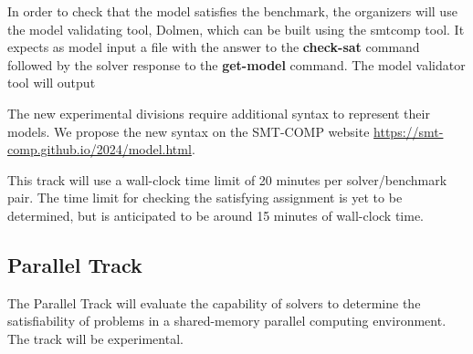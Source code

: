 \documentclass[12pt]{article}
\newcommand{\akey}[1]{\textbf{#1}\xspace}
\newcommand{\paralleltrack}{Parallel Track\xspace}
\begin{document}
In order to check that the model satisfies the benchmark, the organizers will
use the model validating tool, Dolmen, which can be built using the smtcomp tool.
It expects as model input a file with the answer to the \akey{check-sat}
command followed by the solver response to the \akey{get-model} command.
The model validator tool will output

The new experimental divisions require additional syntax to represent
their models.  We propose the new syntax on the SMT-COMP website
{\url{https://smt-comp.github.io/2024/model.html}}.

This track will use a wall-clock time limit of 20 minutes per solver/benchmark
pair. The time limit for checking the satisfying assignment is yet to be
determined, but is anticipated to be around 15 minutes of wall-clock time.


\subsection{\paralleltrack{}}
The \paralleltrack{} will evaluate the capability of solvers to
determine the satisfiability of problems in a shared-memory parallel
computing environment.  The track will be experimental.
\end{document}

